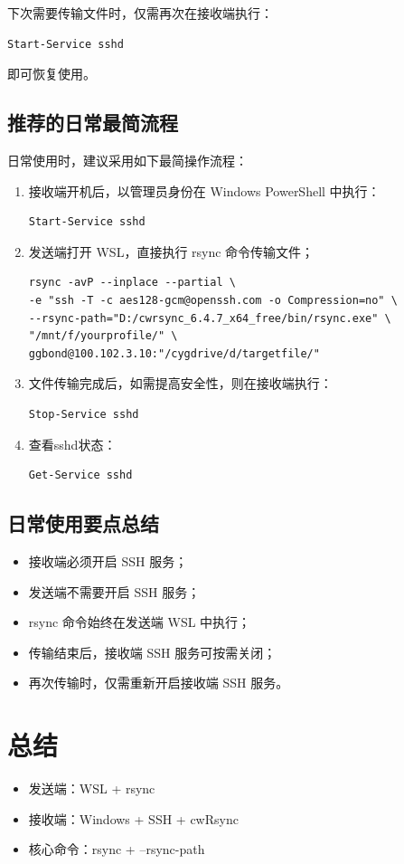 \documentclass[UTF8]{ctexart}
\begin{document}
下次需要传输文件时，仅需再次在接收端执行：

\begin{lstlisting}
Start-Service sshd
\end{lstlisting}

即可恢复使用。

\subsection{推荐的日常最简流程}

日常使用时，建议采用如下最简操作流程：

\begin{enumerate}
    \item 接收端开机后，以管理员身份在 Windows PowerShell 中执行：
\begin{lstlisting}
Start-Service sshd
\end{lstlisting}

    \item 发送端打开 WSL，直接执行 rsync 命令传输文件；
\begin{lstlisting}
rsync -avP --inplace --partial \
-e "ssh -T -c aes128-gcm@openssh.com -o Compression=no" \
--rsync-path="D:/cwrsync_6.4.7_x64_free/bin/rsync.exe" \
"/mnt/f/yourprofile/" \
ggbond@100.102.3.10:"/cygdrive/d/targetfile/"
\end{lstlisting}
    \item 文件传输完成后，如需提高安全性，则在接收端执行：
\begin{lstlisting}
Stop-Service sshd
\end{lstlisting}

    \item 查看sshd状态：
\begin{lstlisting}
Get-Service sshd
\end{lstlisting}
\end{enumerate} 
\subsection{日常使用要点总结}

\begin{itemize}
    \item 接收端必须开启 SSH 服务；
    \item 发送端不需要开启 SSH 服务；
    \item rsync 命令始终在发送端 WSL 中执行；
    \item 传输结束后，接收端 SSH 服务可按需关闭；
    \item 再次传输时，仅需重新开启接收端 SSH 服务。
\end{itemize}

\section{总结}

\begin{itemize}
\item 发送端：WSL + rsync
\item 接收端：Windows + SSH + cwRsync
\item 核心命令：rsync + --rsync-path
\end{itemize}
\end{document}
